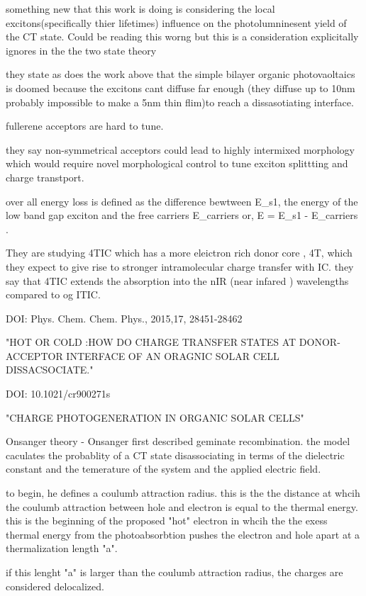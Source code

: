     something new that this work is doing is considering the local excitons(specifically thier lifetimes) 
    influence on the photolumninesent yield of the CT state. Could be reading this worng but this is a consideration explicitally
    ignores in the the two state theory

    they state as does the work above that the simple bilayer organic photovaoltaics is doomed because the excitons cant diffuse far enough
    (they diffuse up to 10nm probably impossible to make a 5nm thin flim)to reach a dissasotiating interface. 

    fullerene acceptors are hard to tune. 

    they say non-symmetrical acceptors could lead to highly intermixed morphology which would require novel morphological control to tune 
    exciton splittting and charge transtport. 

    over all energy loss is defined as the difference bewtween E_{s1}, the energy of the low band gap exciton and the free carriers E_{carriers}
    or, \Delta E = E_{s1} - E_{carriers} .


    They are studying 4TIC which has a more eleictron rich donor core , 4T, which they expect to give rise to
    stronger intramolecular charge transfer with IC. they say that 4TIC extends the absorption into the 
    nIR (near infared ) wavelengths compared to og ITIC.


DOI: 	Phys. Chem. Chem. Phys., 2015,17, 28451-28462
        
"HOT OR COLD :HOW DO CHARGE TRANSFER STATES AT DONOR-ACCEPTOR INTERFACE OF AN ORAGNIC SOLAR CELL DISSACSOCIATE."
        
DOI: 10.1021/cr900271s

"CHARGE PHOTOGENERATION IN ORGANIC SOLAR CELLS"
    
    Onsanger theory - Onsanger first described geminate recombination. the model caculates the probablity
    of a CT state  disassociating in terms of the dielectric constant and the temerature of the system and the 
    applied electric field.

    to begin, he defines a coulumb attraction radius. this is the the distance at whcih the coulumb attraction
    between hole and electron is equal to the thermal energy. this is the beginning of the proposed "hot" electron
    in whcih the the exess thermal energy from the photoabsorbtion pushes the electron and hole apart at a 
    thermalization length "a". 

    if this lenght "a" is larger than the coulumb attraction radius, the charges are considered delocalized.

